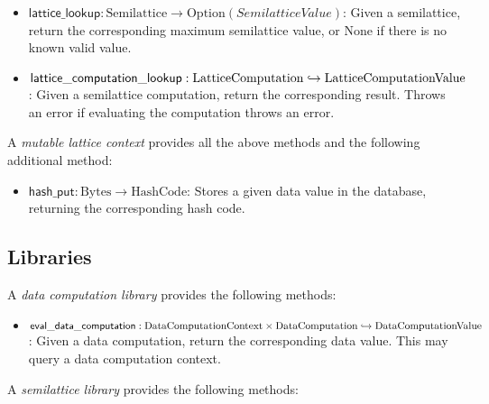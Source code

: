 \documentclass{article}
\begin{document}
      \newcommand{\latticelookup}{\ensuremath{\mathsf{lattice\_lookup}}}
      \newcommand{\latticecomputationlookup}{\ensuremath{\mathsf{lattice\_computation\_lookup}}}

      \begin{itemize}
        \item $\latticelookup : \mathrm{Semilattice} \to \mathrm{Option}(SemilatticeValue)$: Given a semilattice, return the corresponding maximum semilattice value, or $\mathrm{None}$ if there is no known valid value.
        \item $\latticecomputationlookup : \mathrm{LatticeComputation} \partialto \mathrm{LatticeComputationValue}$: Given a semilattice computation, return the corresponding result. Throws an error if evaluating the computation throws an error.
      \end{itemize}

      A \emph{mutable lattice context} provides all the above methods and the following additional method:

      \newcommand{\hashput}{\ensuremath{\mathsf{hash\_put}}}

      \begin{itemize}
        \item $\hashput : \mathrm{Bytes} \to \mathrm{HashCode}$: Stores a given data value in the database, returning the corresponding hash code.
      \end{itemize}

    \subsection{Libraries}

      A \emph{data computation library} provides the following methods:

      \newcommand{\evaldatacomputation}{\ensuremath{\mathsf{eval\_data\_computation}}}

      \begin{itemize}
        \item $\evaldatacomputation : \mathrm{DataComputationContext} \times \mathrm{DataComputation} \partialto \mathrm{DataComputationValue}$: Given a data computation, return the corresponding data value. This may query a data computation context.
      \end{itemize}

      A \emph{semilattice library} provides the following methods:

      \newcommand{\transport}{\ensuremath{\mathsf{transport}}}
      \newcommand{\evallatticecomputation}{\ensuremath{\mathsf{eval\_lattice\_computation}}}
\end{document}
